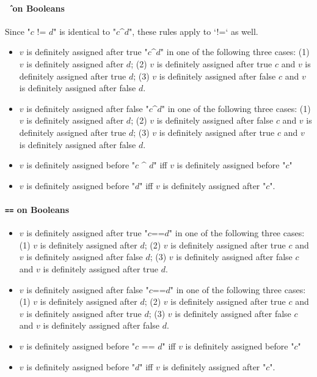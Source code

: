 \paragraph{{\tt \^{~}} on Booleans}
Since \xcdmath"$c$ != $d$" is identical to \xcdmath"$c$^$d$", these rules
apply to \xcd`!=` as well.
\begin{itemize}
\item  $v$ is definitely assigned after true \xcdmath"$c$^$d$" in one of the
       following three cases: 
       (1)  $v$ is definitely assigned after $d$;
       (2)  $v$ is definitely assigned after true $c$ and  $v$ is
            definitely assigned after true $d$;
       (3)  $v$ is definitely assigned after false $c$ and  $v$ is
            definitely assigned after false $d$.

\item  $v$ is definitely assigned after false \xcdmath"$c$^$d$" in one of the
       following three cases: 
       (1)  $v$ is definitely assigned after $d$;
       (2)  $v$ is definitely assigned after false $c$ and  $v$ is
            definitely assigned after true $d$;
       (3)  $v$ is definitely assigned after true $c$ and  $v$ is
            definitely assigned after false $d$.
\item  $v$ is definitely assigned before  \xcdmath"$c$ ^ $d$" 
       iff  $v$ is definitely assigned before \xcdmath"$c$" 
\item  $v$ is definitely assigned before \xcdmath"$d$" 
       iff 
       $v$ is definitely assigned after \xcdmath"$c$".

\end{itemize}

\paragraph{{\tt ==} on Booleans}
\begin{itemize}
\item  $v$ is definitely assigned after true \xcdmath"$c$==$d$" in one of the
       following three cases: 
       (1)  $v$ is definitely assigned after $d$;
       (2)  $v$ is definitely assigned after true $c$ and  $v$ is
            definitely assigned after false $d$;
       (3)  $v$ is definitely assigned after false $c$ and  $v$ is
            definitely assigned after true $d$.

\item  $v$ is definitely assigned after false \xcdmath"$c$==$d$" in one of the
       following three cases: 
       (1)  $v$ is definitely assigned after $d$;
       (2)  $v$ is definitely assigned after true $c$ and  $v$ is
            definitely assigned after true $d$;
       (3)  $v$ is definitely assigned after false $c$ and  $v$ is
            definitely assigned after false $d$.
\item  $v$ is definitely assigned before  \xcdmath"$c$ == $d$" 
       iff  $v$ is definitely assigned before \xcdmath"$c$" 
\item  $v$ is definitely assigned before \xcdmath"$d$" 
       iff 
       $v$ is definitely assigned after \xcdmath"$c$".

\end{itemize}

